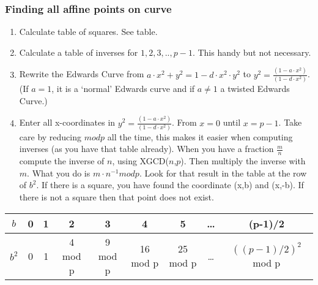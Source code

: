 \documentclass{article}
\begin{document}
\subsubsection{Finding all affine points on curve}
\begin{enumerate}
\item Calculate table of squares. See table.
\item Calculate a table of inverses for $1,2,3,.., p-1$. This handy but not necessary.
\item Rewrite the Edwards Curve from $a \cdot x^2 + y^2 = 1 - d \cdot x^2 \cdot y^2$ to $y^2 = \frac{(1 - a \cdot x^2)}{(1-d \cdot x^2)}$. (If $a=1$, it is a `normal' Edwards curve and if $a\not= 1$ a twisted Edwards Curve.)
\item Enter all x-coordinates in $y^2 = \frac{(1 - a \cdot x^2)}{(1-d \cdot x^2)}$. From $x = 0$ until $x = p-1$. Take care by reducing $mod p$ all the time, this makes it easier when computing inverses (as you have that table already). When you have a fraction $\frac{m}{n}$ compute the inverse of $n$, using XGCD($n$,$p$). Then multiply the inverse with $m$. What you do is $m \cdot n^{-1} mod p$. Look for that result in the table at the row of $b^2$. If there is a square, you have found the coordinate (x,b) and (x,-b). If there is not a square then that point does not exist.

\end{enumerate}



\begin{tabular}{|c|c|c|c|c|c|c|c|c|}
\hline
$b $ & 0 & 1 & 2 & 3 & 4 & 5 & \ldots & (p-1)/2 \\
\hline
$b^2 $ & 0 & 1 & 4 mod p & 9 mod p & 16 mod p & 25 mod p & \ldots & $((p-1)/2)^2$ mod p \\
\hline
\end{tabular}


\end{document}
